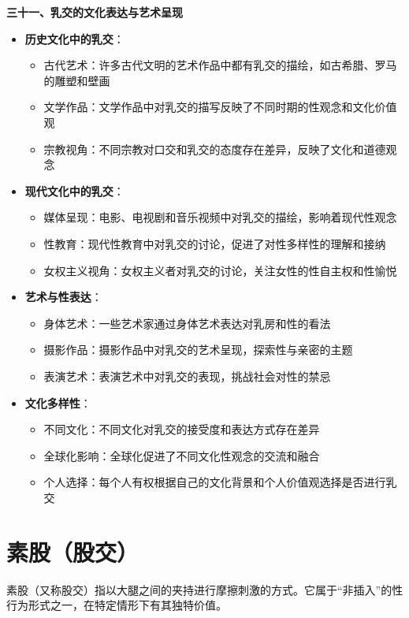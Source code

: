 \documentclass[12pt,UTF8]{ctexbook}
\begin{document}
  \textbf{三十一、乳交的文化表达与艺术呈现}
  \begin{itemize}
  \item \textbf{历史文化中的乳交}：
    \begin{itemize}
    \item 古代艺术：许多古代文明的艺术作品中都有乳交的描绘，如古希腊、罗马的雕塑和壁画
    \item 文学作品：文学作品中对乳交的描写反映了不同时期的性观念和文化价值观
    \item 宗教视角：不同宗教对口交和乳交的态度存在差异，反映了文化和道德观念
    \end{itemize}
  \item \textbf{现代文化中的乳交}：
    \begin{itemize}
    \item 媒体呈现：电影、电视剧和音乐视频中对乳交的描绘，影响着现代性观念
    \item 性教育：现代性教育中对乳交的讨论，促进了对性多样性的理解和接纳
    \item 女权主义视角：女权主义者对乳交的讨论，关注女性的性自主权和性愉悦
    \end{itemize}
  \item \textbf{艺术与性表达}：
    \begin{itemize}
    \item 身体艺术：一些艺术家通过身体艺术表达对乳房和性的看法
    \item 摄影作品：摄影作品中对乳交的艺术呈现，探索性与亲密的主题
    \item 表演艺术：表演艺术中对乳交的表现，挑战社会对性的禁忌
    \end{itemize}
  \item \textbf{文化多样性}：
    \begin{itemize}
    \item 不同文化：不同文化对乳交的接受度和表达方式存在差异
    \item 全球化影响：全球化促进了不同文化性观念的交流和融合
    \item 个人选择：每个人有权根据自己的文化背景和个人价值观选择是否进行乳交
    \end{itemize}
  \end{itemize}

\section{素股（股交）}

素股（又称股交）指以大腿之间的夹持进行摩擦刺激的方式。它属于“非插入”的性行为形式之一，在特定情形下有其独特价值。
\end{document}
